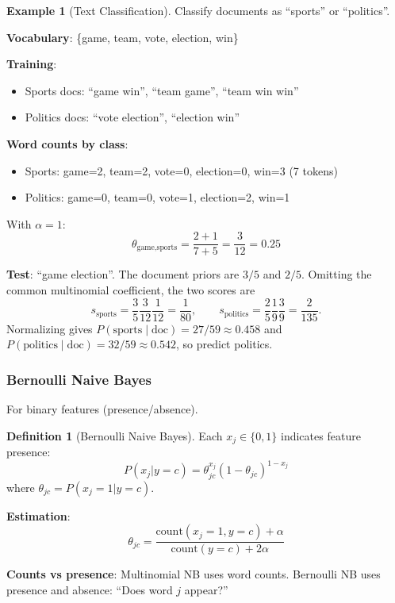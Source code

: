 \documentclass[11pt,twoside]{article}
\numberwithin{equation}{section}
\theoremstyle{plain}
\theoremstyle{definition}
\newtheorem{definition}[theorem]{Definition}
\newtheorem{example}[theorem]{Example}
\theoremstyle{remark}
\begin{document}
\begin{example}[Text Classification]
Classify documents as ``sports'' or ``politics''.

\textbf{Vocabulary}: \{game, team, vote, election, win\}

\textbf{Training}:
\begin{itemize}
\item Sports docs: ``game win'', ``team game'', ``team win win''
\item Politics docs: ``vote election'', ``election win''
\end{itemize}

\textbf{Word counts by class}:
\begin{itemize}
\item Sports: game=2, team=2, vote=0, election=0, win=3 (7 tokens)
\item Politics: game=0, team=0, vote=1, election=2, win=1
\end{itemize}

With $\alpha=1$:
\[
\theta_{\text{game,sports}} = \frac{2+1}{7+5} = \frac{3}{12} = 0.25
\]

\textbf{Test}: ``game election''. The document priors are $3/5$ and $2/5$. Omitting the common multinomial coefficient, the two scores are
\[
s_{\mathrm{sports}}=\frac35\frac3{12}\frac1{12}=\frac1{80},\qquad
s_{\mathrm{politics}}=\frac25\frac1{9}\frac3{9}=\frac2{135}.
\]
Normalizing gives $P(\mathrm{sports}\mid\mathrm{doc})=27/59\approx0.458$ and $P(\mathrm{politics}\mid\mathrm{doc})=32/59\approx0.542$, so predict politics.
\end{example}

\subsubsection{Bernoulli Naive Bayes}

For binary features (presence/absence).

\begin{definition}[Bernoulli Naive Bayes]
Each $x_j \in \{0, 1\}$ indicates feature presence:
\[
P(x_j | y=c) = \theta_{jc}^{x_j}(1-\theta_{jc})^{1-x_j}
\]
where $\theta_{jc} = P(x_j=1 | y=c)$.

\textbf{Estimation}:
\[
\theta_{jc} = \frac{\text{count}(x_j=1, y=c) + \alpha}{\text{count}(y=c) + 2\alpha}
\]
\end{definition}

\textbf{Counts vs presence}: Multinomial NB uses word counts. Bernoulli NB uses presence and absence: ``Does word $j$ appear?''
\end{document}
